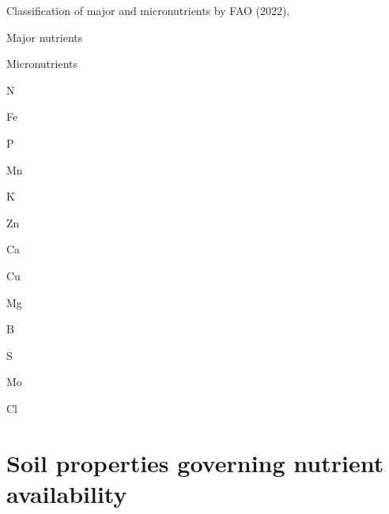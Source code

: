 \documentclass[
  10pt,
  b5paper,
  oneside]{book}
\begin{document}
\label{tab:nutrients}Classification of major and micronutrients by FAO (2022).

Major nutrients

Micronutrients

N

Fe

P

Mn

K

Zn

Ca

Cu

Mg

B

S

Mo

Cl

\hypertarget{soil-properties-governing-nutrient-availability}{%
\section{Soil properties governing nutrient availability}\label{soil-properties-governing-nutrient-availability}}
\end{document}
